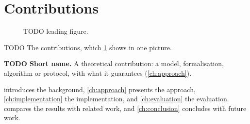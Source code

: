 \section{Contributions}
\begin{figure}[!ht]
  \centering
  \caption{TODO leading figure.}
  \label{guide:fig:overview}
\end{figure}

TODO The contributions, which \cref{guide:fig:overview} shows in one picture.
\begin{contributions}
  \item\label{c:method} \textbf{TODO Short name.} A theoretical contribution: a model, formalisation, algorithm or protocol, with what it guarantees (\cref{ch:approach}).
\end{contributions}

 introduces the background, \cref{ch:approach} presents the approach, \cref{ch:implementation} the implementation, and \cref{ch:evaluation} the evaluation.  compares the results with related work, and \cref{ch:conclusion} concludes with future work.
